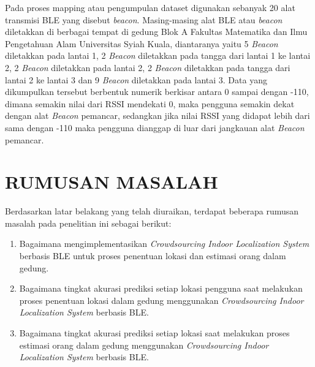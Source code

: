 \par Pada proses mapping atau pengumpulan dataset digunakan sebanyak 20 alat transmisi BLE yang disebut \textit{beacon}. Masing-masing alat BLE atau \textit{beacon} diletakkan di berbagai tempat di gedung Blok A Fakultas Matematika dan Ilmu Pengetahuan Alam Universitas Syiah Kuala, diantaranya yaitu  5 \textit{Beacon} diletakkan pada lantai 1, 2 \textit{Beacon} diletakkan pada tangga dari lantai 1 ke lantai 2,  2 \textit{Beacon} diletakkan pada lantai 2,  2 \textit{Beacon} diletakkan pada tangga dari lantai 2 ke lantai 3 dan 9 \textit{Beacon} diletakkan pada lantai 3. Data yang dikumpulkan  tersebut  berbentuk  numerik  berkisar  antara  0  sampai  dengan  -110, dimana semakin nilai dari RSSI mendekati 0, maka pengguna semakin dekat dengan alat \textit{Beacon}  pemancar,  sedangkan  jika  nilai  RSSI  yang  didapat  lebih  dari  sama dengan -110 maka pengguna dianggap di luar dari jangkauan alat \textit{Beacon} pemancar.

\par

\fancyhf{}
\fancyfoot[R]{\thepage}

\section{\uppercase{RUMUSAN MASALAH}}
Berdasarkan latar belakang yang telah diuraikan, terdapat beberapa rumusan masalah pada penelitian ini sebagai berikut:
\begin{enumerate}
	\item Bagaimana mengimplementasikan \textit{Crowdsourcing Indoor Localization System} berbasis BLE untuk proses penentuan lokasi dan estimasi orang dalam gedung.
	\item Bagaimana tingkat akurasi prediksi setiap lokasi pengguna saat melakukan proses  penentuan lokasi dalam gedung menggunakan \textit{Crowdsourcing Indoor Localization System} berbasis BLE.
	\item Bagaimana tingkat akurasi prediksi setiap lokasi saat melakukan proses estimasi orang dalam gedung menggunakan \textit{Crowdsourcing Indoor Localization System} berbasis BLE.

\end{enumerate}

